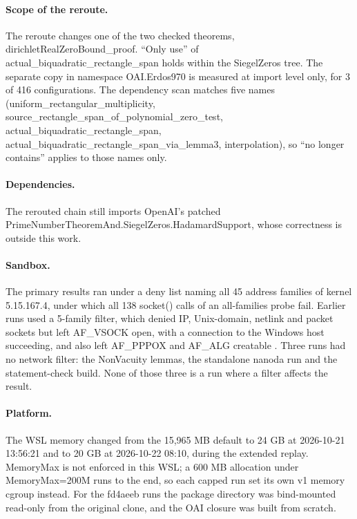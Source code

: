 \paragraph{Scope of the reroute.}
The reroute changes one of the two checked theorems, dirichletRealZeroBound\_proof. %
``Only use'' of actual\_biquadratic\_rectangle\_span holds within the SiegelZeros tree. %
The separate copy in namespace OAI.Erdos970 is measured at import level only, for 3 of 416 configurations. %
The dependency scan matches five names (uniform\_rectangular\_multiplicity, source\_rectangle\_span\_of\_polynomial\_zero\_test, actual\_biquadratic\_rectangle\_span, actual\_biquadratic\_rectangle\_span\_via\_lemma3, interpolation), so ``no longer contains'' applies to those names only. %

\paragraph{Dependencies.}
The rerouted chain still imports OpenAI's patched PrimeNumberTheoremAnd.SiegelZeros.HadamardSupport, whose correctness is outside this work. %

\paragraph{Sandbox.}
The primary results ran under a deny list naming all 45 address families of kernel 5.15.167.4, under which all 138 socket() calls of an all-families probe fail. %
Earlier runs used a 5-family filter, which denied IP, Unix-domain, netlink and packet sockets but left AF\_VSOCK open, with a connection to the Windows host succeeding, and also left AF\_PPPOX and AF\_ALG creatable \cite{grwtsk-40}. %
Three runs had no network filter: the NonVacuity lemmas, the standalone nanoda run and the statement-check build. %
None of those three is a run where a filter affects the result. %

\paragraph{Platform.}
The WSL memory changed from the 15,965 MB default to 24 GB at 2026-10-21 13:56:21 and to 20 GB at 2026-10-22 08:10, during the extended replay. %
MemoryMax is not enforced in this WSL; a 600 MB allocation under MemoryMax=200M runs to the end, so each capped run set its own v1 memory cgroup instead. %
For the fd4aeeb runs the package directory was bind-mounted read-only from the original clone, and the OAI closure was built from scratch. %

